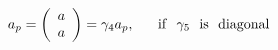\begin{equation}
a_{p}= \left(
\begin{array}{c}
a \\  a
\end{array}     \right) = \gamma_{4} a_{p},~~~~~{\rm if}~~ \gamma_{5}~~ {\rm is~~ diagonal} \nonumber
\end{equation}

